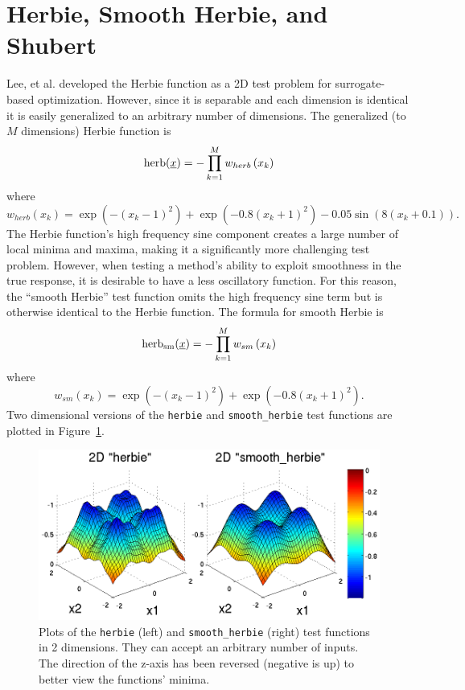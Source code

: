 \section{Herbie, Smooth Herbie, and Shubert}
Lee, et al. \cite{herbiefunc} developed the Herbie function as a 2D
test problem for surrogate-based optimization. However, since it is
separable and each dimension is identical it is easily generalized to
an arbitrary number of dimensions. The generalized (to $M$
dimensions) Herbie function is
\begin{displaymath}
{\rm herb}(\underline{x})=-\prod_{k=1}^M w_{herb}\left(x_k\right)
\end{displaymath}
where
\begin{displaymath}
w_{herb}\left(x_k\right)=\exp(-(x_k-1)^2)+\exp(-0.8(x_k+1)^2)-0.05\sin\left(8\left(x_k+0.1\right)\right).
\end{displaymath}
The Herbie function's high frequency sine component creates a large
number of local minima and maxima, making it a significantly more
challenging test problem. However, when testing a method's ability to
exploit smoothness in the true response, it is desirable to have a
less oscillatory function. For this reason, the ``smooth Herbie''
test function omits the high frequency sine term but is otherwise
identical to the Herbie function. The formula for smooth Herbie is
\begin{displaymath}
{\rm herb_{sm}}(\underline{x})=-\prod_{k=1}^M w_{sm}\left(x_k\right)
\end{displaymath}
where
\begin{displaymath}
w_{sm}\left(x_k\right)=\exp(-(x_k-1)^2)+\exp(-0.8(x_k+1)^2).
\end{displaymath}
Two dimensional versions of the \texttt{herbie} and \texttt{smooth\_herbie}
test functions are plotted in Figure~\ref{fig:2D_herbie__smooth_herbie}.
\begin{figure}[hbp]
  \centering
  \centerline{\includegraphics[scale=1.0]{images/DAK5pt2_2D__herbie__smooth_herbie}}
  \caption{Plots of the \texttt{herbie} (left) and
           \texttt{smooth\_herbie} (right) test functions in 2
           dimensions. They can accept an arbitrary number of
           inputs. The direction of the z-axis has been reversed
           (negative is up) to better view the functions' minima.}
  \label{fig:2D_herbie__smooth_herbie}
\end{figure}

